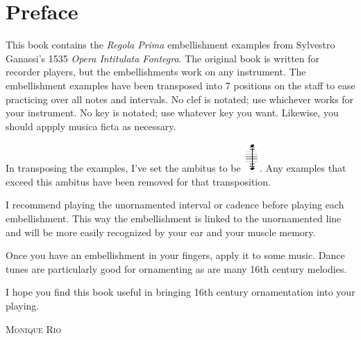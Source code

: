\documentclass[11pt]{book}
\begin{document}

\setcounter{page}{1}
\section*{Preface}
This book contains the \textit{Regola Prima} embellishment examples from Sylvestro Ganassi's 1535 \textit{Opera Intitulata Fontegra}.	The original book is written for recorder players, but the embellishments work on any instrument. The embellishment examples have been transposed into 7 positions on the staff to ease practicing over all notes and intervals. No clef is notated; use whichever works for your instrument. No key is notated; use whatever key you want. Likewise, you should appply musica ficta as necessary. 

In transposing the examples, I've set the ambitus to be \includegraphics[height=3em]{snippit.png}. Any examples that exceed this ambitus have been removed for that transposition. 


I recommend playing the unornamented interval or cadence before playing each embellishment. This way the embellishment is linked to the unornamented line and will be more easily recognized by your ear and your muscle memory. 

Once you have an embellishment in your fingers, apply it to some music. Dance tunes are particularly good for ornamenting as are many 16th century melodies.

I hope you find this book useful in bringing 16th century ornamentation into your playing. 
\begin{flushright}
\textsc{Monique Rio}
\end{flushright}

\clearpage
{}
\setcounter{page}{1}
\thispagestyle{FooBar}



\thispagestyle{FooBar}

\end{document}
